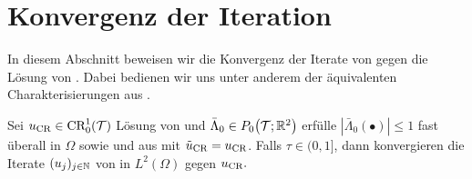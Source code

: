 \section{Konvergenz der Iteration}
In diesem Abschnitt beweisen wir die Konvergenz der Iterate von
 gegen die Lösung von
. 
Dabei bedienen wir uns unter anderem der äquivalenten Charakterisierungen aus
.

\begin{theorem}
  Sei $u_\textup{CR}\in \textup{CR}^1_0(\mathcal{T})$ Lösung von  und
  $\bar\Lambda_0\in P_0\!\left(\mathcal{T};\mathbb{R}^2\right)$ erfülle
  $\left|\bar\Lambda_0(\bullet)\right|\leq 1$ fast überall in $\Omega$ sowie
   und
   aus
   mit
  $\tilde{u}_{\textup{CR}}=u_\textup{CR}$.
  Falls $\tau \in (0, 1]$, dann konvergieren die Iterate $(u_j)_{j\in\mathbb{N}}$ von
   in $L^2(\Omega)$ gegen $u_\textup{CR}.$
\end{theorem}

